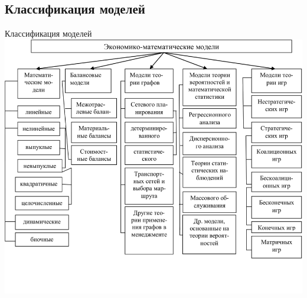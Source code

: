 \documentclass[unicode,11pt,notheorems]{beamer}
\begin{document}
\subsection{Классификация моделей}

\begin{frame}{Классификация моделей}
	\centering
	\includegraphics[width=\textwidth]{models.png}
\end{frame}
\end{document}
